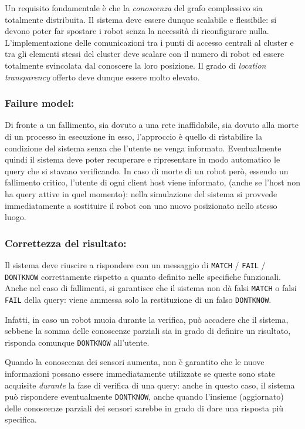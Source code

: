 Un requisito fondamentale è che
la \emph{conoscenza} del grafo complessivo sia totalmente distribuita.
Il sistema deve essere dunque scalabile e flessibile:
si devono poter far spostare i robot senza la necessità di
riconfigurare nulla. L'implementazione delle
comunicazioni tra i punti di accesso centrali al cluster e
tra gli elementi stessi del cluster
deve scalare con il numero di robot ed essere totalmente
svincolata dal conoscere la loro posizione.
Il grado di \emph{location transparency} offerto
deve dunque essere molto elevato.

\subsubsection*{Failure model:}
Di fronte a un fallimento, sia dovuto a una rete inaffidabile,
sia dovuto alla morte di un processo in esecuzione in esso,
l'approccio è quello di ristabilire la
condizione del sistema senza che
l'utente ne venga informato. Eventualmente quindi il sistema deve poter
recuperare e ripresentare in modo automatico le query che si stavano
verificando. In caso di morte di un robot però,
essendo un fallimento critico, l'utente di ogni client host viene informato,
(anche se l'host non ha query attive in quel momento):
nella simulazione del sistema si provvede immediatamente a
sostituire il robot con uno nuovo posizionato nello stesso luogo.

\subsubsection*{Correttezza del risultato:}
Il sistema deve riuscire a rispondere con un messaggio di
\texttt{MATCH} / \texttt{FAIL} / \texttt{DONTKNOW} correttamente
rispetto a quanto definito nelle specifiche funzionali.
Anche nel caso di fallimenti, si garantisce che
il sistema non dà falsi \texttt{MATCH} o falsi \texttt{FAIL} della query:
viene ammessa solo la restituzione di un falso \texttt{DONTKNOW}.

Infatti,
in caso un robot muoia durante la verifica, può accadere che il sistema,
sebbene la somma delle conoscenze parziali sia in grado di definire
un risultato, risponda comunque \texttt{DONTKNOW} all'utente.

Quando la conoscenza dei sensori aumenta,
non è garantito che le nuove informazioni possano essere immediatamente
utilizzate se queste sono state acquisite \emph{durante} la fase di verifica
di una query: anche in questo caso, il sistema può rispondere eventualmente
\texttt{DONTKNOW}, anche quando l'insieme (aggiornato) delle conoscenze
parziali dei sensori sarebbe in grado di dare una risposta più specifica.


